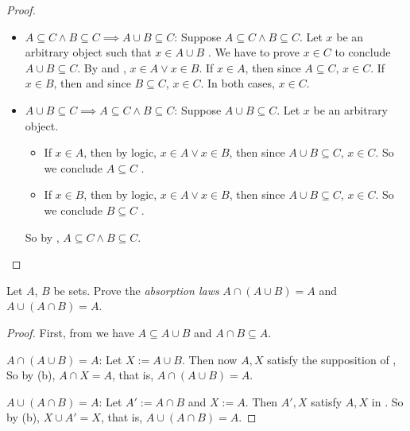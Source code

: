 \begin{proof}
\begin{itemize}
        \begin{itemize}
            \item \(A \subseteq C \land B \subseteq C \implies A \cup B \subseteq C\): Suppose \(A \subseteq C \land B \subseteq C\). Let \(x\) be an arbitrary object such that \(x \in A \cup B\) . We have to prove \(x \in C\) to conclude \(A \cup B \subseteq C\). By  and , \(x \in A \lor x \in B\). If \(x \in A\), then since \(A \subseteq C\), \(x \in C\). If \(x \in B\), then and since \(B \subseteq C\), \(x \in C\). In both cases, \(x \in C\).
            \item \(A \cup B \subseteq C \implies A \subseteq C \land B \subseteq C\): Suppose \(A \cup B \subseteq C\). Let \(x\) be an arbitrary object.
            \begin{itemize}
                \item If \(x \in A\), then by logic, \(x \in A \lor x \in B\), then since \(A \cup B \subseteq C\), \(x \in C\). So we conclude \(A \subseteq C\) .
                \item If \(x \in B\), then by logic, \(x \in A \lor x \in B\), then since \(A \cup B \subseteq C\), \(x \in C\). So we conclude \(B \subseteq C\) .
            \end{itemize}
            So by , \(A \subseteq C \land B \subseteq C\).
        \end{itemize}
\end{itemize}
\end{proof}

\begin{exercise}\label{exercise 3.1.8}
Let \(A\), \(B\) be sets. Prove the \emph{absorption laws} \(A \cap (A \cup B) = A\) and \(A \cup (A \cap B) = A\).
\end{exercise}

\begin{proof} First, from  we have \(A \subseteq A \cup B\) and \(A \cap B \subseteq A\).

\(A \cap (A \cup B) = A\): Let \(X := A \cup B\). Then now \(A, X\) satisfy the supposition of , So by (b), \(A \cap X = A\), that is, \(A \cap (A \cup B) = A\).

\(A \cup (A \cap B) = A\): Let \(A' := A \cap B\) and \(X := A\). Then \(A', X\) satisfy \(A, X\) in . So by (b), \(X \cup A' = X\), that is, \(A \cup (A \cap B) = A\).
\end{proof}

